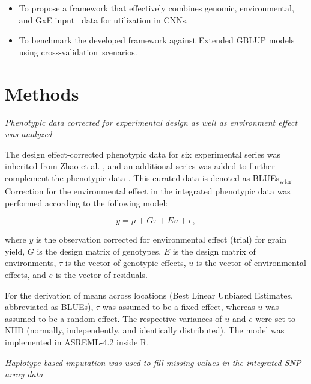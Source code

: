 \documentclass[english, biblatex]{lni}
\begin{document}
\begin{itemize}
    \item To propose a framework that effectively combines genomic, environmental, and GxE input \
data for utilization in CNNs.
    \item To benchmark the developed framework against Extended GBLUP models using cross-validation\ 
scenarios.
\end{itemize}

\section{Methods}

\textit{Phenotypic data corrected for experimental design as well as environment effect was analyzed}

The design effect-corrected phenotypic data for six experimental series was inherited from Zhao et al. \cite{zhao2021unlocking}, and an additional series was added to further complement the phenotypic data \cite{gogna_gabi_2022}. This curated data is denoted as BLUEs\textsubscript{wtn}. Correction for the environmental effect in the integrated phenotypic data was performed according to the following model:

\hspace{0.5cm}\begin{minipage}{\dimexpr\linewidth-0.5cm}
\begin{equation}
y = \mu + G\tau + Eu + e,
\end{equation}
\end{minipage}

where \(y\) is the observation corrected for environmental effect (trial) for grain yield, \(G\) is the design matrix of genotypes, \(E\) is the design matrix of environments, \(\tau\) is the vector of genotypic effects, \(u\) is the vector of environmental effects, and \(e\) is the vector of residuals.

For the derivation of means across locations (Best Linear Unbiased Estimates, abbreviated as BLUEs), \(\tau\) was assumed to be a fixed effect, whereas \(u\) was assumed to be a random effect. The respective variances of \(u\) and \(e\) were set to NIID (normally, independently, and identically distributed). The model was implemented in ASREML-4.2 inside R.

\textit{Haplotype based imputation was used to fill missing values in the integrated SNP array data}
\end{document}
